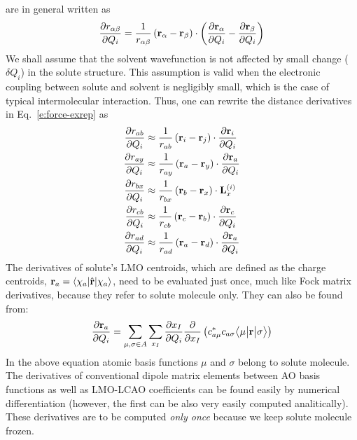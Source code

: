 \documentclass[a4paper,titlepage,twoside,fleqn,12pt]{book}
\newcommand{\tbraket}[3]{\ensuremath{\bigl\langle {#1} \bigl\lvert {#2} \bigl\lvert {#3} \bigr\rangle}}
\newcommand{\fderiv}[2]{\ensuremath{
\frac{\partial #1}{\partial #2}}}
\begin{document}
\begin{refsection}
are in general written as 
%
\begin{equation}\label{e:dr}
\fderiv{r_{\alpha\beta}}{Q_i} = 
\frac{1}{r_{\alpha\beta}} 
\left( {\bf r}_\alpha - {\bf r}_\beta \right) \cdot
\left( \fderiv{{\bf r}_\alpha}{Q_i} - \fderiv{{\bf r}_\beta}{Q_i} \right)
\end{equation}
%
We shall assume that the solvent wavefunction is not affected 
by small change ($\delta Q_i$) in the solute structure. This assumption 
is valid when the electronic coupling between solute and 
solvent is negligibly small, which is the case of typical 
intermolecular interaction. Thus, one can rewrite 
the distance derivatives in Eq.~\eqref{e:force-exrep} as
%
\begin{subequations}
\begin{align}
\fderiv{r_{ab}}{Q_i} &\approx \frac{1}{r_{ab}} 
\left( {\bf r}_i - {\bf r}_j \right) \cdot
\fderiv{{\bf r}_i}{Q_i} \\
\fderiv{r_{ay}}{Q_i} &\approx \frac{1}{r_{ay}} 
\left( {\bf r}_a - {\bf r}_y \right) \cdot
\fderiv{{\bf r}_a}{Q_i} \\
\fderiv{r_{bx}}{Q_i} &\approx \frac{1}{r_{bx}} 
\left( {\bf r}_b - {\bf r}_x \right) \cdot
{\bf L}_x^{(i)} \\
\fderiv{r_{cb}}{Q_i} &\approx \frac{1}{r_{cb}} 
\left( {\bf r}_c - {\bf r}_b \right) \cdot
\fderiv{{\bf r}_c}{Q_i} \\
\fderiv{r_{ad}}{Q_i} &\approx \frac{1}{r_{ad}} 
\left( {\bf r}_a - {\bf r}_d \right) \cdot
\fderiv{{\bf r}_a}{Q_i}
\end{align}
\end{subequations}
%
The derivatives of solute's LMO centroids, which are defined as 
the charge centroids, ${\bf r}_a=\langle \chi_a\lvert\hat{\bf r}\rvert\chi_a\rangle$, 
need to be evaluated just once, 
much like Fock matrix derivatives, because they refer to solute 
molecule only. They can also be found from:
%
\begin{equation}\label{e:ddfg7676s2}
\fderiv{{\bf r}_a}{Q_i} = 
\sum_{\mu,\sigma \in A}\sum_{x_I}
\fderiv{x_I}{Q_i} \fderiv{}{x_I} 
\left( c_{a\mu}^* c_{a\sigma} \tbraket{\mu}{{\bf r}}{\sigma}\right)
\end{equation}
%
In the above equation atomic basis functions $\mu$ and $\sigma$ 
belong to solute molecule. The derivatives of conventional dipole
matrix elements between AO basis functions as well as LMO-LCAO
coefficients can be found easily by numerical differentiation
(however, the first can be also very easily computed analitically).
These derivatives are to be computed \emph{only once} because
we keep solute molecule frozen.%


\end{refsection}
\end{document}
